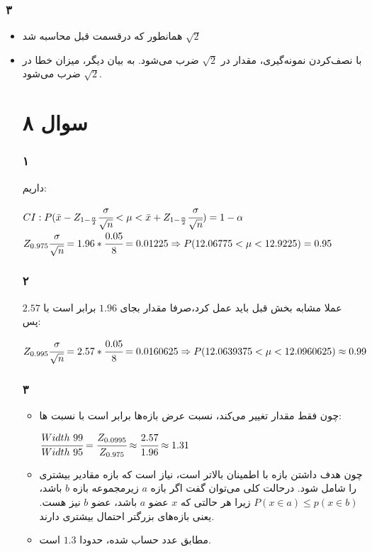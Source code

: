 \documentclass[12pt]{article}
\begin{document}
\subsubsection{۳}
\begin{itemize}
طبق فرمول 
نسبت سایز نمونه‌ها ثابت است یعنی سایز نمونه هر گروه نصف می‌شود. با توجه به فرمول  می‌توان دید که با نصف شدن همه 
ها، مقدار  
$\sqrt{2}$
برابر می‌شود. یعنی 
$64,845,978$
\item 
همانطور که درقسمت قبل محاسبه شد
$\sqrt{2}$
\item 
با نصف‌کردن نمونه‌گیری، ‌مقدار 
در
$\sqrt{2}$
ضرب می‌شود. به بیان دیگر، میزان خطا در 
$\sqrt{2}$
ضرب می‌شود.


	\section{سوال ۸}
	\subsubsection{۱}
	داریم:
	\begin{latin}
		$
	CI: P(\bar{x} - Z_{1 - \frac{\alpha}{2}} \cfrac{\sigma}{\sqrt{n}} < \mu < \bar{x} + Z_{1 - \frac{\alpha}{2}} \cfrac{\sigma}{\sqrt{n}}) = 1 - \alpha
	$
	\\
	$
	Z_{0.975} \cfrac{\sigma}{\sqrt{n}} = 1.96 * \cfrac{0.05}{8} = 0.01225 \Rightarrow P(12.06775 < \mu < 12.9225) = 0.95 
		$   
	\end{latin}
	\subsubsection{۲}
	عملا مشابه بخش قبل باید عمل کرد،‌صرفا مقدار 
	بجای 
	$1.96$
	برابر است با
	$2.57$
	پس:
	\begin{latin}
		$
		Z_{0.995} \cfrac{\sigma}{\sqrt{n}} = 2.57 * \cfrac{0.05}{8} = 0.0160625 \Rightarrow
		P(12.0639375 < \mu < 12.0960625) \approx 0.99
		$
	\end{latin}
		\subsubsection{۳}
		\begin{itemize}
			\item 
		چون فقط  مقدار 
		تغییر می‌کند، نسبت عرض بازه‌ها برابر است با نسبت 
		ها:
		\begin{latin}
			$
			\cfrac{Width\ 99}{Width\ 95} = \cfrac{Z_{0.0995}}{Z_{0.975}} \approx \cfrac{2.57}{1.96} \approx 1.31
			$
		\end{latin}
		\item 
		چون هدف داشتن بازه با اطمینان بالاتر است، نیاز است که بازه مقادیر بیشتری را شامل شود. درحالت کلی می‌توان گفت اگر بازه $a$ زیرمجموعه بازه $b$ باشد، 
		$P(x \in a) \leq p(x \in b)$
		زیرا هر حالتی که 
		$x$
		عضو $a$ باشد، عضو $b$ نیز هست. یعنی بازه‌های بزرگتر احتمال بیشتری دارند.
		\item 
		مطابق عدد حساب شده، حدودا 
		$1.3$ 
		است.
	\end{itemize}

\end{itemize}
\end{document}

